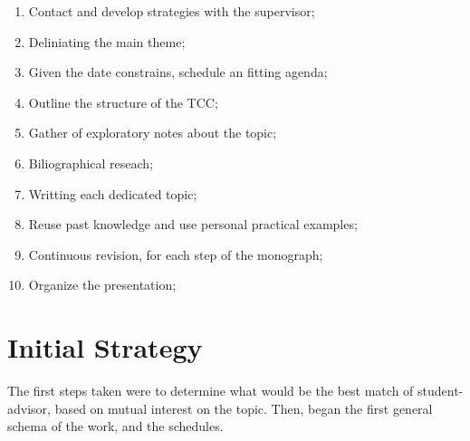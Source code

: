 \documentclass[
12pt,				%
openright,			%
oneside,			%
a4paper,			%
brazil,				%
english,			  %
]{abntex2}
\begin{document}
\begin{enumerate}
  \item Contact and develop strategies with the supervisor;
  \item Deliniating the main theme;
  \item Given the date constrains, schedule an fitting agenda;
  \item Outline the structure of the TCC;
  \item Gather of exploratory notes about the topic;
  \item Biliographical reseach;
  \item Writting each dedicated topic;
  \item Reuse past knowledge and use personal practical examples; 
  \item Continuous revision, for each step of the monograph;
  \item Organize the presentation;
\end{enumerate}

\section{Initial Strategy}
The first steps taken were to determine what would be the best match of student-advisor, based on mutual interest on the topic. Then, began the first general schema of the work, and the schedules.

\end{document}
